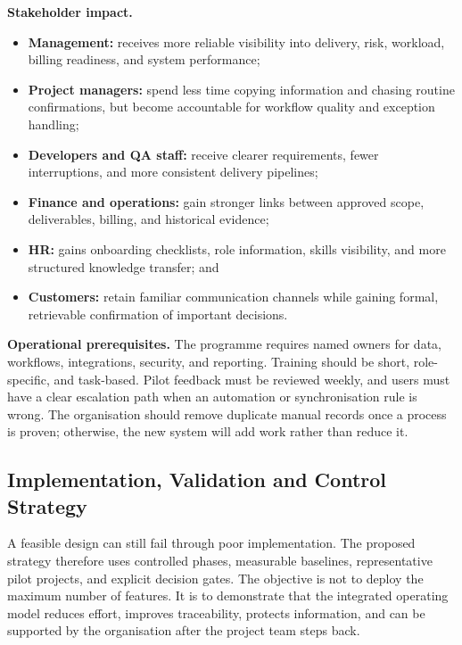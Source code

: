 \documentclass[12pt,a4paper]{report}
\begin{document}
\textbf{Stakeholder impact.}
\begin{itemize}[leftmargin=1.6em]
    \item \textbf{Management:} receives more reliable visibility into delivery, risk, workload,
          billing readiness, and system performance;
    \item \textbf{Project managers:} spend less time copying information and chasing routine
          confirmations, but become accountable for workflow quality and exception handling;
    \item \textbf{Developers and QA staff:} receive clearer requirements, fewer interruptions,
          and more consistent delivery pipelines;
    \item \textbf{Finance and operations:} gain stronger links between approved scope,
          deliverables, billing, and historical evidence;
    \item \textbf{HR:} gains onboarding checklists, role information, skills visibility, and more
          structured knowledge transfer; and
    \item \textbf{Customers:} retain familiar communication channels while gaining formal,
          retrievable confirmation of important decisions.
\end{itemize}

\textbf{Operational prerequisites.}
The programme requires named owners for data, workflows, integrations, security, and reporting.
Training should be short, role-specific, and task-based. Pilot feedback must be reviewed weekly,
and users must have a clear escalation path when an automation or synchronisation rule is wrong.
The organisation should remove duplicate manual records once a process is proven; otherwise,
the new system will add work rather than reduce it.



\subsection{Implementation, Validation and Control Strategy}
\label{sec:implementation-validation}

A feasible design can still fail through poor implementation. The proposed strategy therefore
uses controlled phases, measurable baselines, representative pilot projects, and explicit decision
gates. The objective is not to deploy the maximum number of features. It is to demonstrate that
the integrated operating model reduces effort, improves traceability, protects information, and can
be supported by the organisation after the project team steps back.
\end{document}
